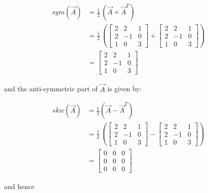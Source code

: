 \documentclass[12pt,bibstyle=none,pagenumberinfooter]{ifmdocument}
\begin{document}
\begin{align}
    sym(\Vec{A})
     & =\frac{1}{2}\,(\vec{A} + \vec{A}^{T})                                          \\
     & = \frac{1}{2}\, \left(  \begin{bmatrix}
            2 & 2 & 1 \\ 2 & -1 & 0 \\ 1 & 0 & 3
        \end{bmatrix} +  \begin{bmatrix}
            2 & 2 & 1 \\ 2 & -1 & 0 \\ 1 & 0 & 3
        \end{bmatrix}
    \right)                                                                           \\
     & = \begin{bmatrix}
        2 & 2 & 1 \\ 2 & -1 & 0 \\ 1 & 0 & 3
    \end{bmatrix}
\end{align}

and the anti-symmetric part of $\vec{A}$ is given by:

\begin{align}
    skw(\Vec{A})
     & = \frac{1}{2}\left(\Vec{A} - \Vec{A}^T \right)                                  \\
     & = \frac{1}{2}\, \left(  \begin{bmatrix}
            2 & 2 & 1 \\ 2 & -1 & 0 \\ 1 & 0 & 3
        \end{bmatrix} -  \begin{bmatrix}
            2 & 2 & 1 \\ 2 & -1 & 0 \\ 1 & 0 & 3
        \end{bmatrix}
    \right)                                                                            \\
     & = \begin{bmatrix}
        0 & 0 & 0 \\ 0 & 0 & 0 \\ 0 & 0 & 0
    \end{bmatrix}
\end{align}



and hence
\end{document}
